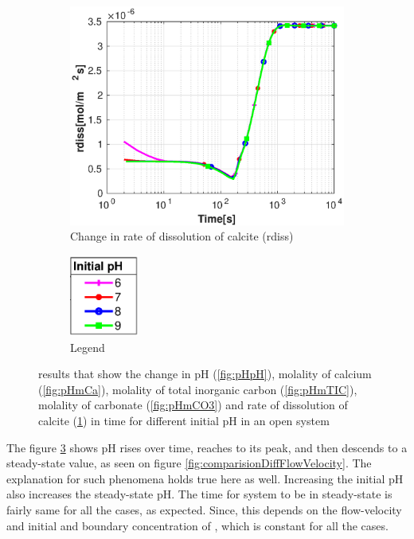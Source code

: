 \begin{figure}[!h]
    \hfill
    \begin{subfigure}{.5\linewidth}
            \centering
        \includegraphics[width=\textwidth]{PICTURES/with_pH_rdiss.eps}
        \caption{Change in rate of dissolution of calcite (rdiss)}
        \label{fig:pHrdiss}
    \end{subfigure}%
  \hfill
  \begin{subfigure}{.5\linewidth}
            \centering
        \includegraphics[width=0.25\textwidth]{PICTURES/with_pH_legend.eps}
        \caption{Legend}
        \label{fig:pHlegend}
    \end{subfigure}%
    \caption{\DuMuX results that show the change in pH (\cref{fig:pHpH}), molality of calcium (\cref{fig:pHmCa}), molality of total inorganic carbon (\cref{fig:pHmTIC}), molality of carbonate (\cref{fig:pHmCO3}) and rate of dissolution of calcite (\cref{fig:pHrdiss}) in time for different initial pH in an open system}
    \label{fig:comparisionDiffInitialpH}
\end{figure}


The figure \ref{fig:comparisionDiffInitialpH} shows pH rises over time, reaches to its peak, and then descends to a steady-state value, as seen on figure \ref{fig:comparisionDiffFlowVelocity}. The explanation for such phenomena holds true here as well. Increasing the initial pH also increases the steady-state pH. The time for system to be in steady-state is fairly same for all the cases, as expected. Since, this depends on the flow-velocity and initial and boundary concentration of , which is constant for all the cases. 

